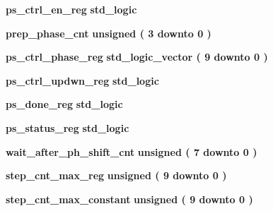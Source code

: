 \begin{DoxyCompactItemize}
\item 
{\bf ps\+\_\+ctrl\+\_\+en\+\_\+reg} {\bfseries \textcolor{comment}{std\+\_\+logic}\textcolor{vhdlchar}{ }} 
\item 
{\bf prep\+\_\+phase\+\_\+cnt} {\bfseries \textcolor{comment}{unsigned}\textcolor{vhdlchar}{ }\textcolor{vhdlchar}{(}\textcolor{vhdlchar}{ }\textcolor{vhdlchar}{ } \textcolor{vhdldigit}{3} \textcolor{vhdlchar}{ }\textcolor{keywordflow}{downto}\textcolor{vhdlchar}{ }\textcolor{vhdlchar}{ } \textcolor{vhdldigit}{0} \textcolor{vhdlchar}{ }\textcolor{vhdlchar}{)}\textcolor{vhdlchar}{ }} 
\item 
{\bf ps\+\_\+ctrl\+\_\+phase\+\_\+reg} {\bfseries \textcolor{comment}{std\+\_\+logic\+\_\+vector}\textcolor{vhdlchar}{ }\textcolor{vhdlchar}{(}\textcolor{vhdlchar}{ }\textcolor{vhdlchar}{ } \textcolor{vhdldigit}{9} \textcolor{vhdlchar}{ }\textcolor{keywordflow}{downto}\textcolor{vhdlchar}{ }\textcolor{vhdlchar}{ } \textcolor{vhdldigit}{0} \textcolor{vhdlchar}{ }\textcolor{vhdlchar}{)}\textcolor{vhdlchar}{ }} 
\item 
{\bf ps\+\_\+ctrl\+\_\+updwn\+\_\+reg} {\bfseries \textcolor{comment}{std\+\_\+logic}\textcolor{vhdlchar}{ }} 
\item 
{\bf ps\+\_\+done\+\_\+reg} {\bfseries \textcolor{comment}{std\+\_\+logic}\textcolor{vhdlchar}{ }} 
\item 
{\bf ps\+\_\+status\+\_\+reg} {\bfseries \textcolor{comment}{std\+\_\+logic}\textcolor{vhdlchar}{ }} 
\item 
{\bf wait\+\_\+after\+\_\+ph\+\_\+shift\+\_\+cnt} {\bfseries \textcolor{comment}{unsigned}\textcolor{vhdlchar}{ }\textcolor{vhdlchar}{(}\textcolor{vhdlchar}{ }\textcolor{vhdlchar}{ } \textcolor{vhdldigit}{7} \textcolor{vhdlchar}{ }\textcolor{keywordflow}{downto}\textcolor{vhdlchar}{ }\textcolor{vhdlchar}{ } \textcolor{vhdldigit}{0} \textcolor{vhdlchar}{ }\textcolor{vhdlchar}{)}\textcolor{vhdlchar}{ }} 
\item 
{\bf step\+\_\+cnt\+\_\+max\+\_\+reg} {\bfseries \textcolor{comment}{unsigned}\textcolor{vhdlchar}{ }\textcolor{vhdlchar}{(}\textcolor{vhdlchar}{ }\textcolor{vhdlchar}{ } \textcolor{vhdldigit}{9} \textcolor{vhdlchar}{ }\textcolor{keywordflow}{downto}\textcolor{vhdlchar}{ }\textcolor{vhdlchar}{ } \textcolor{vhdldigit}{0} \textcolor{vhdlchar}{ }\textcolor{vhdlchar}{)}\textcolor{vhdlchar}{ }} 
\item 
{\bf step\+\_\+cnt\+\_\+max\+\_\+constant} {\bfseries \textcolor{comment}{unsigned}\textcolor{vhdlchar}{ }\textcolor{vhdlchar}{(}\textcolor{vhdlchar}{ }\textcolor{vhdlchar}{ } \textcolor{vhdldigit}{9} \textcolor{vhdlchar}{ }\textcolor{keywordflow}{downto}\textcolor{vhdlchar}{ }\textcolor{vhdlchar}{ } \textcolor{vhdldigit}{0} \textcolor{vhdlchar}{ }\textcolor{vhdlchar}{)}\textcolor{vhdlchar}{ }} 

\end{DoxyCompactItemize}
